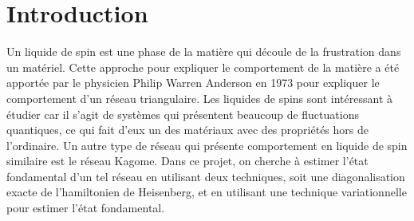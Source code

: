 \documentclass[../main.tex]{subfiles}
\begin{document}
  \section*{Introduction}
  Un liquide de spin est une phase de la matière qui découle de la frustration
  dans un matériel. Cette approche pour expliquer le comportement de la matière
  a été apportée par le physicien Philip Warren Anderson en 1973 pour expliquer
  le comportement d'un réseau triangulaire.
  Les liquides de spins sont intéressant à étudier car il s'agit de systèmes
  qui présentent beaucoup de fluctuations quantiques, ce qui fait d'eux un des
  matériaux avec des propriétés hors de l'ordinaire.
  Un autre type de réseau qui
  présente comportement en liquide de spin similaire est le réseau Kagome. Dans
  ce projet, on cherche à estimer l'état fondamental d'un tel réseau en utilisant
  deux techniques, soit une diagonalisation exacte de l'hamiltonien de
  Heisenberg, et en utilisant une technique variationnelle pour estimer l'état
  fondamental.
\end{document}
